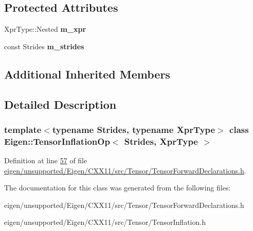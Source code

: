 \subsection*{Protected Attributes}
\begin{DoxyCompactItemize}
\item 
\mbox{\label{class_eigen_1_1_tensor_inflation_op_a4b4667f8c883f8cfdbbd01aada0fd7c9}} 
Xpr\+Type\+::\+Nested {\bfseries m\+\_\+xpr}
\item 
\mbox{\label{class_eigen_1_1_tensor_inflation_op_a91289cb6f3f01a973104bd99f3952b88}} 
const Strides {\bfseries m\+\_\+strides}
\end{DoxyCompactItemize}
\subsection*{Additional Inherited Members}


\subsection{Detailed Description}
\subsubsection*{template$<$typename Strides, typename Xpr\+Type$>$\newline
class Eigen\+::\+Tensor\+Inflation\+Op$<$ Strides, Xpr\+Type $>$}



Definition at line \hyperlink{eigen_2unsupported_2_eigen_2_c_x_x11_2src_2_tensor_2_tensor_forward_declarations_8h_source_l00057}{57} of file \hyperlink{eigen_2unsupported_2_eigen_2_c_x_x11_2src_2_tensor_2_tensor_forward_declarations_8h_source}{eigen/unsupported/\+Eigen/\+C\+X\+X11/src/\+Tensor/\+Tensor\+Forward\+Declarations.\+h}.



The documentation for this class was generated from the following files\+:\begin{DoxyCompactItemize}
\item 
eigen/unsupported/\+Eigen/\+C\+X\+X11/src/\+Tensor/\+Tensor\+Forward\+Declarations.\+h\item 
eigen/unsupported/\+Eigen/\+C\+X\+X11/src/\+Tensor/\+Tensor\+Inflation.\+h\end{DoxyCompactItemize}
